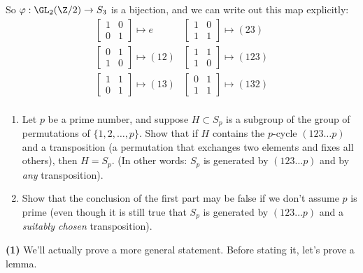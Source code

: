 \documentclass[11pt,letterpaper]{article}
\begin{document}
So $\varphi : \GL_2(\Z /2) \to S_3$ is a bijection, and we can write out this map explicitly:
\begin{align*}
  &\begin{bmatrix}
    1&0\\0&1
  \end{bmatrix}\mapsto e 
  &\begin{bmatrix}
    1&0\\1&1
  \end{bmatrix}\mapsto (23)&\\
  &\begin{bmatrix}
    0&1\\1&0
  \end{bmatrix}\mapsto (12)
  &\begin{bmatrix}
    1&1\\1&0
  \end{bmatrix}\mapsto (123)&\\
  &\begin{bmatrix}
    1&1\\0&1
  \end{bmatrix}\mapsto (13)  
  &\begin{bmatrix}
    0&1\\1&1
  \end{bmatrix}\mapsto (132)&\\
\end{align*}

\pagebreak
\begin{problem}
  \begin{enumerate}
    \item Let $p$ be a prime number, and suppose $H\subset S_p$ is a subgroup of the group of permutations of $\{1,2,\dots,p\}$. Show that if $H$ contains the $p$-cycle $(123\dots p)$ and a transposition (a permutation that exchanges two elements and fixes all others), then $H=S_p$. (In other words: $S_p$ is generated by $(123\dots p)$ and by {\em any} transposition).
    \item Show that the conclusion of the first part may be false if we don't assume $p$ is prime (even though it is still true that $S_p$ is generated by $(123\dots p)$ and a {\em suitably chosen} transposition).
  \end{enumerate}
\end{problem}

\textbf{(1)} We'll actually prove a more general statement. Before stating it, let's prove a lemma.
\end{document}
